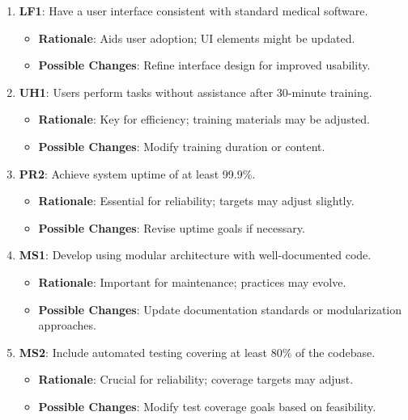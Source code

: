 \documentclass[12pt]{article}
\begin{document}
\begin{enumerate}[resume]
    \item \textbf{LF1}: Have a user interface consistent with standard medical software.
    \begin{itemize}[label=-]
        \item \textbf{Rationale}: Aids user adoption; UI elements might be updated.
        \item \textbf{Possible Changes}: Refine interface design for improved usability.
    \end{itemize}

    \item \textbf{UH1}: Users perform tasks without assistance after 30-minute training.
    \begin{itemize}[label=-]
        \item \textbf{Rationale}: Key for efficiency; training materials may be adjusted.
        \item \textbf{Possible Changes}: Modify training duration or content.
    \end{itemize}

    \item \textbf{PR2}: Achieve system uptime of at least 99.9\%.
    \begin{itemize}[label=-]
        \item \textbf{Rationale}: Essential for reliability; targets may adjust slightly.
        \item \textbf{Possible Changes}: Revise uptime goals if necessary.
    \end{itemize}

    \item \textbf{MS1}: Develop using modular architecture with well-documented code.
    \begin{itemize}[label=-]
        \item \textbf{Rationale}: Important for maintenance; practices may evolve.
        \item \textbf{Possible Changes}: Update documentation standards or modularization approaches.
    \end{itemize}

    \item \textbf{MS2}: Include automated testing covering at least 80\% of the codebase.
    \begin{itemize}[label=-]
        \item \textbf{Rationale}: Crucial for reliability; coverage targets may adjust.
        \item \textbf{Possible Changes}: Modify test coverage goals based on feasibility.
    \end{itemize}


\end{enumerate}
\end{document}
